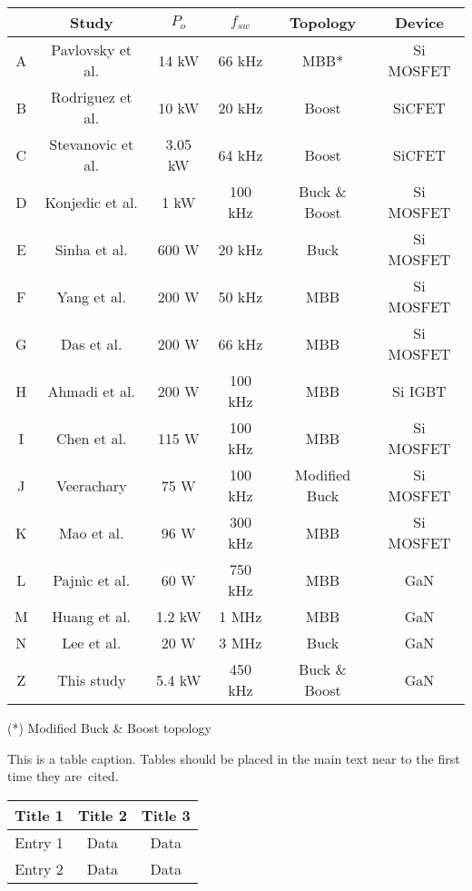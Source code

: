 \documentclass[energies,article,submit,moreauthors,pdftex]{Definitions/mdpi}
\begin{document}
\begin{table}[!t]
\caption{}
\label{tab:Ch6_ConverterComparison}
\centering
\begin{tabular}{|c|c|c|c|c|c|}
\hline
 & Study & $P_o$ & $f_{sw}$  &  Topology & Device\\
 \hline
 A&Pavlovsky et al.  \cite{Pavlovsky2014} &14 kW & 66 kHz    & MBB* & Si MOSFET  \\
 \hline
 B&Rodriguez et al.  \cite{Rodriguez2018} &10 kW & 20 kHz    & Boost  & SiCFET\\
 \hline
 C&Stevanovic et al.  \cite{Stevanovic2019} &3.05 kW & 64 kHz    & Boost  & SiCFET\\
 \hline
 D&Konjedic et al.  \cite{Konjedic2016} &1 kW& 100 kHz   & Buck \& Boost & Si MOSFET\\
 \hline
 E&Sinha et al.   \cite{Sinha2019} &600 W& 20 kHz   & Buck & Si MOSFET\\
 \hline
 F&Yang et al.   \cite{Yang2014} &200 W& 50 kHz    & MBB & Si MOSFET\\
 \hline
 G&Das et al.   \cite{Das2010} &  200 W& 66 kHz  & MBB & Si MOSFET\\
 \hline
 H&Ahmadi  et al.   \cite{Ahmadi2012} & 200 W & 100 kHz & MBB & Si IGBT\\
 \hline
 I&Chen et al.   \cite{Chen2016} & 115 W & 100 kHz & MBB & Si MOSFET\\
 \hline
 J&Veerachary \cite{Veerachary2016} & 75 W & 100 kHz  & Modified Buck & Si MOSFET\\
 \hline
 K&Mao et al.   \cite{Mao2008} & 96 W & 300 kHz & MBB & Si MOSFET\\
 \hline
 L&Pajn\`{i}c et al.   \cite{Pajnic2019} & 60 W & 750 kHz & MBB & GaN\\
 \hline
 M&Huang et al.   \cite{Huang2016b} & 1.2 kW & 1 MHz & MBB & GaN\\
 \hline
 N&Lee et al.   \cite{Lee2015} & 20 W & 3 MHz & Buck & GaN\\
 \hline
 Z & This study & 5.4 kW & 450 kHz & Buck \& Boost & GaN\\
 \hline
\end{tabular}
\begin{flushleft}
(*) Modified Buck \& Boost topology
\end{flushleft}
\end{table}


\begin{specialtable}[H]
\caption{This is a table caption. Tables should be placed in the main text near to the first time they are~cited.\label{tab1}}
\begin{tabular}{ccc}
\toprule
\textbf{Title 1}	& \textbf{Title 2}	& \textbf{Title 3}\\
\midrule
Entry 1		& Data			& Data\\
Entry 2		& Data			& Data\\
\bottomrule
\end{tabular}
\end{specialtable}
\end{document}
